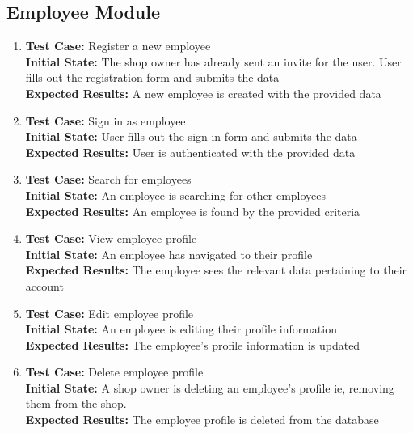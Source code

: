 \documentclass[12pt, titlepage]{article}
\begin{document}
\subsection{Employee Module}
\begin{enumerate}
    \item \textbf{Test Case:} Register a new employee \\
    \textbf{Initial State:} The shop owner has already sent an invite for the user. User fills out the registration form and submits the data \\
    \textbf{Expected Results:} A new employee is created with the provided data
    
    \item \textbf{Test Case:} Sign in as employee \\
    \textbf{Initial State:} User fills out the sign-in form and submits the data \\
    \textbf{Expected Results:} User is authenticated with the provided data
    
    \item \textbf{Test Case:} Search for employees \\
    \textbf{Initial State:} An employee is searching for other employees \\
    \textbf{Expected Results:} An employee is found by the provided criteria
    
    \item \textbf{Test Case:} View employee profile \\
    \textbf{Initial State:} An employee has navigated to their profile \\
    \textbf{Expected Results:} The employee sees the relevant data pertaining to their account
    
    \item \textbf{Test Case:} Edit employee profile \\
    \textbf{Initial State:} An employee is editing their profile information \\
    \textbf{Expected Results:} The employee's profile information is updated
    
    \item \textbf{Test Case:} Delete employee profile \\
    \textbf{Initial State:} A shop owner is deleting an employee's profile ie, removing them from the shop. \\
    \textbf{Expected Results:} The employee profile is deleted from the database
\end{enumerate}
\end{document}
